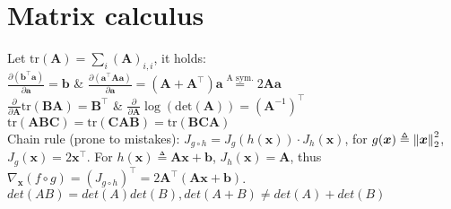 \section{Matrix calculus}
Let $\text{tr}(\bm{A})=\sum_{i}(\bm{A})_{i,i}$, it holds:\\
  $\frac{\partial(\bm{b}^{\top}\bm{a})}{\partial \bm{a}}=\bm{b}$ & $\frac{\partial(\bm{a}^{\top}\bm{Aa})}{\partial \bm{a}} = (\bm{A} + \bm{A}^{\top})\bm{a}
\overset{\text{A sym.}}{=} 2\bm{A}\bm{a}$\\
  $\frac{\partial}{\partial \bm{A}}\text{tr}(\bm{BA})=\bm{B}^{\top}$ & $\frac{\partial}{\partial \bm{A}}\log(\text{det}(\bm{A})) = (\bm{A}^{-1})^{\top}$
  $\text{tr}(\bm{ABC}) = \text{tr}(\bm{CAB}) = \text{tr}(\bm{BCA})$\\
Chain rule (prone to mistakes): $J_{g \circ h} = J_{g}(h(\bm{x})) \cdot J_{h}(\bm{x})$,
for $g(\bm{x}) \triangleq \left\lVert\bm{x}\right\rVert_{2}^{2}$, $J_{g}(\bm{x}) = 2\bm{x}^{\top}$.
For $h(\bm{x}) \triangleq \bm{A}\bm{x} + \bm{b}$, $J_{h}(\bm{x}) = \bm{A}$,
thus $\nabla_{\bm{x}} (f\circ g) = (J_{g \circ h})^{\top} = 2\bm{A}^{\top}(\bm{Ax}+\bm{b})$.\\
$det(AB) = det(A)det(B), det(A+B) \neq det(A) + det(B)$


